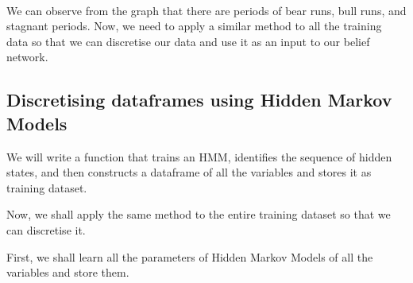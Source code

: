 \documentclass[11pt]{report}
\begin{document}
    \begin{center}
    \end{center}
    { \hspace*{\fill} \\}
    
    We can observe from the graph that there are periods of bear runs, bull
runs, and stagnant periods. Now, we need to apply a similar method to
all the training data so that we can discretise our data and use it as
an input to our belief network.

\hypertarget{discretising-dataframes-using-hidden-markov-models}{%
\subsection{Discretising dataframes using Hidden Markov
Models}\label{discretising-dataframes-using-hidden-markov-models}}

We will write a function that trains an HMM, identifies the sequence of
hidden states, and then constructs a dataframe of all the variables and
stores it as training dataset.

    Now, we shall apply the same method to the entire training dataset so
that we can discretise it.

First, we shall learn all the parameters of Hidden Markov Models of all
the variables and store them.
\end{document}
